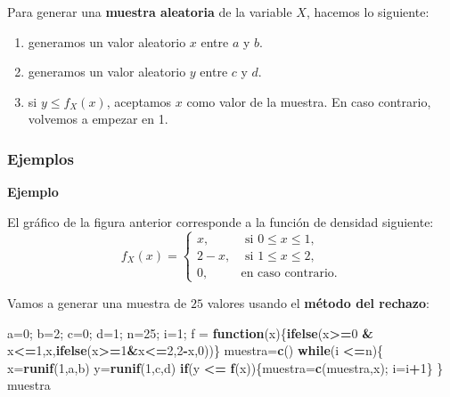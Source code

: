 \documentclass[]{book}
\newenvironment{Shaded}{\begin{snugshade}}{\end{snugshade}}
\newcommand{\ControlFlowTok}[1]{\textcolor[rgb]{0.13,0.29,0.53}{\textbf{#1}}}
\newcommand{\DecValTok}[1]{\textcolor[rgb]{0.00,0.00,0.81}{#1}}
\newcommand{\KeywordTok}[1]{\textcolor[rgb]{0.13,0.29,0.53}{\textbf{#1}}}
\newcommand{\NormalTok}[1]{#1}
\newcommand{\OperatorTok}[1]{\textcolor[rgb]{0.81,0.36,0.00}{\textbf{#1}}}
\newcommand{\StringTok}[1]{\textcolor[rgb]{0.31,0.60,0.02}{#1}}
\begin{document}
Para generar una \textbf{muestra aleatoria} de la variable \(X\), hacemos lo siguiente:

\begin{enumerate}
\def\labelenumi{\arabic{enumi})}
\item
  generamos un valor aleatorio \(x\) entre \(a\) y \(b\).
\item
  generamos un valor aleatorio \(y\) entre \(c\) y \(d\).
\item
  si \(y\leq f_X(x)\), aceptamos \(x\) como valor de la muestra. En caso contrario, volvemos a empezar en 1.
\end{enumerate}

\hypertarget{ejemplos-1}{%
\subsubsection{Ejemplos}\label{ejemplos-1}}

\textbf{Ejemplo}

El gráfico de la figura anterior corresponde a la función de densidad siguiente:
\[
f_X(x)=\begin{cases}
x, & \mbox{ si }0\leq x\leq 1,\\
2-x, & \mbox{ si }1\leq x\leq 2,\\
0, & \mbox{en caso contrario.}
\end{cases}
\]

Vamos a generar una muestra de \(25\) valores usando el \textbf{método del rechazo}:

\begin{Shaded}
\begin{Highlighting}[]
\NormalTok{a=}\DecValTok{0}\NormalTok{; b=}\DecValTok{2}\NormalTok{; c=}\DecValTok{0}\NormalTok{; d=}\DecValTok{1}\NormalTok{; n=}\DecValTok{25}\NormalTok{; i=}\DecValTok{1}\NormalTok{;}
\NormalTok{f =}\StringTok{ }\ControlFlowTok{function}\NormalTok{(x)\{}\KeywordTok{ifelse}\NormalTok{(x}\OperatorTok{>=}\DecValTok{0} \OperatorTok{&}\StringTok{ }\NormalTok{x}\OperatorTok{<=}\DecValTok{1}\NormalTok{,x,}\KeywordTok{ifelse}\NormalTok{(x}\OperatorTok{>=}\DecValTok{1}\OperatorTok{&}\NormalTok{x}\OperatorTok{<=}\DecValTok{2}\NormalTok{,}\DecValTok{2}\OperatorTok{-}\NormalTok{x,}\DecValTok{0}\NormalTok{))\}}
\NormalTok{muestra=}\KeywordTok{c}\NormalTok{()}
\ControlFlowTok{while}\NormalTok{(i }\OperatorTok{<=}\NormalTok{n)\{}
\NormalTok{  x=}\KeywordTok{runif}\NormalTok{(}\DecValTok{1}\NormalTok{,a,b)}
\NormalTok{  y=}\KeywordTok{runif}\NormalTok{(}\DecValTok{1}\NormalTok{,c,d)}
  \ControlFlowTok{if}\NormalTok{(y }\OperatorTok{<=}\StringTok{ }\KeywordTok{f}\NormalTok{(x))\{muestra=}\KeywordTok{c}\NormalTok{(muestra,x); i=i}\OperatorTok{+}\DecValTok{1}\NormalTok{\}}
\NormalTok{\}}
\NormalTok{muestra}
\end{Highlighting}
\end{Shaded}
\end{document}

